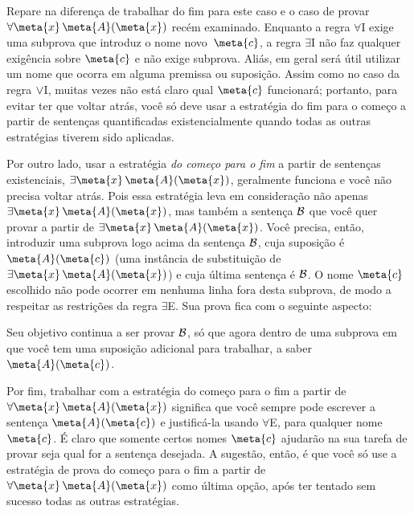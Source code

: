 Repare na diferença de trabalhar do fim para  este caso e o caso de provar $\forall \meta{x}\, \atom{\meta{A}}{\meta{x}}$ recém examinado. Enquanto a regra $\forall$I exige uma subprova que introduz o nome novo~$\meta{c}$, a regra $\exists$I não faz qualquer exigência sobre $\meta{c}$ e não exige subprova. Aliás, em geral será útil utilizar um nome que ocorra em alguma premissa ou suposição.
Assim como no caso da regra $\vee$I, muitas vezes não está claro qual $\meta{c}$ funcionará; portanto, para evitar ter que voltar atrás, você só deve usar a estratégia do fim para o começo a partir de sentenças quantificadas existencialmente quando todas as outras estratégias tiverem sido aplicadas.

Por outro lado, usar a estratégia \emph{do começo para o fim} a partir de sentenças existenciais,  $\exists \meta{x}\, \atom{\meta{A}}{\meta{x}}$, geralmente funciona e você não precisa voltar atrás. Pois essa estratégia leva em consideração não apenas
 $\exists \meta{x}\, \atom{\meta{A}}{\meta{x}}$, 
mas também a sentença $\mathcal{B}$ que você quer provar a partir de $\exists \meta{x}\, \atom{\meta{A}}{\meta{x}}$.
Você precisa, então, introduzir uma subprova logo acima da sentença $\mathcal{B}$, cuja suposição é $\atom{\meta{A}}{\meta{c}}$ (uma instância de substituição de $\exists \meta{x}\, \atom{\meta{A}}{\meta{x}}$) e cuja última sentença é $\mathcal{B}$. O nome $\meta{c}$  escolhido não pode ocorrer em nenhuma linha fora desta subprova, de modo a respeitar as restrições da regra $\exists$E. Sua prova fica com o seguinte aspecto:

\begin{fitchproof}
	\ellipsesline
	\ellipsesline
	\open
	\ellipsesline
	\close
\end{fitchproof}
Seu objetivo continua a ser provar $\mathcal{B}$, só que agora dentro de uma subprova em que você tem uma suposição adicional para trabalhar, a saber~$\atom{\meta{A}}{\meta{c}}$.

Por fim, trabalhar com a estratégia do começo para o fim a partir de $\forall \meta{x}\, \atom{\meta{A}}{\meta{x}}$ significa que você sempre pode escrever a sentença $\atom{\meta{A}}{\meta{c}}$ e justificá-la usando $\forall$E, para qualquer nome~$\meta{c}$.  É claro que somente certos nomes $\meta{c}$ ajudarão na sua tarefa de provar seja qual for a sentença desejada. 
A sugestão, então, é que você só use a estratégia de prova do começo para o fim a partir de  $\forall \meta{x}\, \atom{\meta{A}}{\meta{x}}$ como última opção, após ter tentado sem sucesso todas as outras estratégias.


